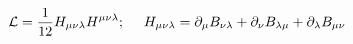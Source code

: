 \begin{equation}
{\cal L} = \frac{1}{12}H_{\mu\nu\lambda}H^{\mu\nu\lambda}; ~~~~H_{\mu\nu\lambda} = 
\partial_\mu B_{\nu\lambda} + \partial_\nu B_{\lambda\mu} + \partial_\lambda B_{\mu\nu} 
\label{199}
\end{equation}

